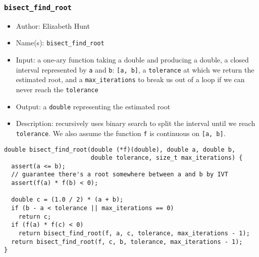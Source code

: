 \documentclass[11pt]{article}
\begin{document}
\subsubsection{\texttt{bisect\_find\_root}}
\label{sec:orgf8a3f0e}
\begin{itemize}
\item Author: Elizabeth Hunt
\item Name(s): \texttt{bisect\_find\_root}
\item Input: a one-ary function taking a double and producing a double, a closed interval represented
by \texttt{a} and \texttt{b}: \texttt{[a, b]}, a \texttt{tolerance} at which we return the estimated root, and a
\texttt{max\_iterations} to break us out of a loop if we can never reach the \texttt{tolerance}
\item Output: a \texttt{double} representing the estimated root
\item Description: recursively uses binary search to split the interval until we reach \texttt{tolerance}. We
also assume the function \texttt{f} is continuous on \texttt{[a, b]}.
\end{itemize}

\begin{verbatim}
double bisect_find_root(double (*f)(double), double a, double b,
                        double tolerance, size_t max_iterations) {
  assert(a <= b);
  // guarantee there's a root somewhere between a and b by IVT
  assert(f(a) * f(b) < 0);

  double c = (1.0 / 2) * (a + b);
  if (b - a < tolerance || max_iterations == 0)
    return c;
  if (f(a) * f(c) < 0)
    return bisect_find_root(f, a, c, tolerance, max_iterations - 1);
  return bisect_find_root(f, c, b, tolerance, max_iterations - 1);
}
\end{verbatim}
\end{document}
